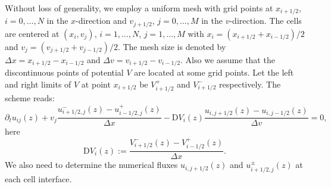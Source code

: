 \documentclass[12pt]{article}
\theoremstyle{plain}
\theoremstyle{remark}
\theoremstyle{remark}
\theoremstyle{remark}
\numberwithin{equation}{section}
\newcommand{\Dx}{\Delta x}
\newcommand{\Dv}{\Delta v}
\begin{document}
Without loss of generality, we employ a uniform mesh with grid points at $x_{i+1/2}$, $i=0,\dotsc, N$ in the $x$-direction and $v_{j+1/2}$, $j = 0, \dotsc, M$ in the $v$-direction. The cells are centered at $(x_i,v_j)$, $i = 1, \dotsc, N$, $j = 1, \dotsc, M$ with $x_i = (x_{i+1/2} + x_{i-1/2})/2$ and $v_j = (v_{j+1/2} + v_{j-1/2})/2$. The mesh size is denoted by $\Delta x=x_{i+1/2}-x_{i-1/2}$ and $\Delta v=v_{i+1/2}-v_{i-1/2}$. Also we assume that the discontinuous points of potential $V$ are located at some grid points. Let the left and right limits of $V$ at point $x_{i+1/2}$ be $V^+_{i+1/2}$ and $V^-_{i+1/2}$ respectively. The scheme reads:
\begin{equation}\label{semi_dis}
  \partial_t u_{ij}(z) + v_j\frac{u^-_{i+1/2,j}(z)-u^+_{i-1/2,j}(z)}{\Dx}-\mathrm{D}V_i(z)\frac{u_{i,j+1/2}(z)-u_{i,j-1/2}(z)}{\Dv}=0,
\end{equation}
here 
\begin{equation}
  \mathrm{D}V_i(z) := \dfrac{V^-_{i+1/2}(z)-V^+_{i-1/2}(z)}{\Dx}.
\end{equation}
We also need to determine the numerical fluxes $u_{i, j+1/2}(z)$ and $u^{\pm}_{i+1/2, j}(z)$ at each cell interface. %

\end{document}
